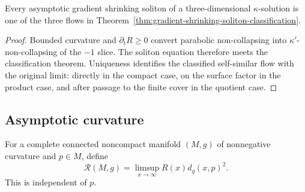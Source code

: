 \begin{corollary}\label{cor:asymptotic-soliton-classification-application}

Every asymptotic gradient shrinking soliton of a three-dimensional
$\kappa$-solution is one of the three flows in
Theorem~\ref{thm:gradient-shrinking-soliton-classification}.
\end{corollary}
\begin{proof}
\sketch
{}
Bounded curvature and $\partial_tR\geq0$ convert parabolic
non-collapsing into $\kappa'$-non-collapsing of the $-1$ slice.
The soliton equation therefore meets the classification theorem.
Uniqueness identifies the classified self-similar flow with the
original limit: directly in the compact case, on the surface factor
in the product case, and after passage to the finite cover in the
quotient case.
\end{proof}

\subsection{Asymptotic curvature}

\begin{definition}\label{def:asymptotic-scalar-curvature}
For a complete connected noncompact manifold $(M,g)$ of
nonnegative curvature and $p\in M$, define
\[
 \mathcal R(M,g)=\limsup_{x\to\infty}R(x)d_g(x,p)^2.
\]
This is independent of $p$.
\end{definition}

